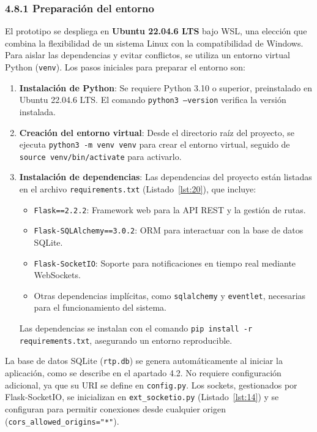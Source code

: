 \subsubsection*{4.8.1 \; Preparación del entorno}

El prototipo se despliega en \textbf{Ubuntu 22.04.6 LTS} bajo WSL, una elección que combina la flexibilidad de un sistema Linux con la compatibilidad de Windows. Para aislar las dependencias y evitar conflictos, se utiliza un entorno virtual Python (\texttt{venv}). Los pasos iniciales para preparar el entorno son:

\begin{enumerate}
    \item \textbf{Instalación de Python}: Se requiere Python 3.10 o superior, preinstalado en Ubuntu 22.04.6 LTS. El comando \texttt{python3 --version} verifica la versión instalada.
    \item \textbf{Creación del entorno virtual}: Desde el directorio raíz del proyecto, se ejecuta \texttt{python3 -m venv venv} para crear el entorno virtual, seguido de \texttt{source venv/bin/activate} para activarlo.
    \item \textbf{Instalación de dependencias}: Las dependencias del proyecto están listadas en el archivo \texttt{requirements.txt} (Listado~\ref{lst:20}), que incluye:
        \begin{itemize}
            \item \texttt{Flask==2.2.2}: Framework web para la API REST y la gestión de rutas.
            \item \texttt{Flask-SQLAlchemy==3.0.2}: ORM para interactuar con la base de datos SQLite.
            \item \texttt{Flask-SocketIO}: Soporte para notificaciones en tiempo real mediante WebSockets.
            \item Otras dependencias implícitas, como \texttt{sqlalchemy} y \texttt{eventlet}, necesarias para el funcionamiento del sistema.
        \end{itemize}
        Las dependencias se instalan con el comando \texttt{pip install -r requirements.txt}, asegurando un entorno reproducible.
\end{enumerate}

La base de datos SQLite (\texttt{rtp.db}) se genera automáticamente al iniciar la aplicación, como se describe en el apartado 4.2. No requiere configuración adicional, ya que su URI se define en \texttt{config.py}. Los sockets, gestionados por Flask-SocketIO, se inicializan en \texttt{ext\_socketio.py} (Listado~\ref{lst:14}) y se configuran para permitir conexiones desde cualquier origen (\texttt{cors\_allowed\_origins="*"}).

